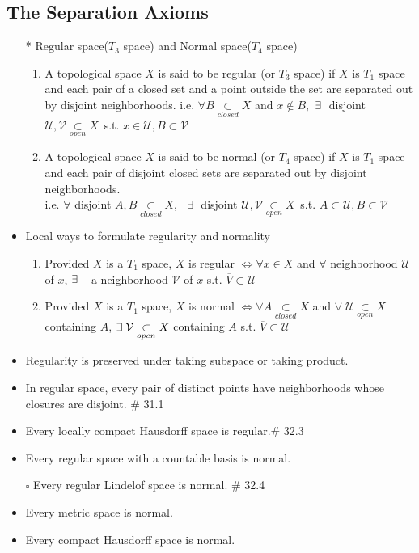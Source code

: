 \documentclass[12pt]{article}
\newcommand{\sq}{$\square$}
\newcommand{\spone}{\hspace{0.1cm}}
\newcommand{\U}{\mathcal{U}}
\newcommand{\V}{\mathcal{V}}
\newcommand{\open}{\underset{open}{\subset}}
\newcommand{\closed}{\underset{closed}{\subset}}
\newcommand{\cl}{\overline}
\newcommand{\exist}{\exists\spone}
\begin{document}
\subsection{The Separation Axioms}
\smallskip
\begin{itemize}
	\item[*] Regular space($T_3$ space) and Normal space($T_4$ space)
	\begin{enumerate}
		\item A topological space $X$ is said to be regular (or $T_3$ space) if $X$ is $T_1$ space and each pair of a closed set and a point outside the set are separated out by disjoint neighborhoods. i.e. $\forall B\closed X$ and $x\notin B$,\, $\exist$ disjoint\; $\U, \V\open X$\, s.t. $x\in \U, B\subset \V$
		\item A topological space $X$ is said to be normal (or $T_4$ space) if $X$ is $T_1$ space and each pair of disjoint closed sets are separated out by disjoint neighborhoods.\\ i.e. $\forall$ disjoint\; $A,B\closed X$, \, $\exist$ disjoint\; $\U, \V \open X$\, s.t. $A\subset \U, B\subset \V$
	\end{enumerate} 
	\item Local ways to formulate regularity and normality
	\begin{enumerate}
		\item Provided $X$ is a $T_1$ space, $X$ is regular $\Leftrightarrow \forall x\in X$ and $\forall$ neighborhood $\U$ of $x$, $\exist$ \, a neighborhood $\V$ of $x$ s.t. $\cl{V}\subset \U$
		\item Provided $X$ is a $T_1$ space, $X$ is normal $\Leftrightarrow \forall A\closed X$ and $\forall \; \U\open X$ containing $A$, $\exist \V \open X$ containing $A$ s.t. $\cl{V}\subset \U$  
	\end{enumerate}
	\item Regularity is preserved under taking subspace or taking product.
	\item In regular space, every pair of distinct points have neighborhoods whose closures are disjoint. \quad \# 31.1
	\item Every locally compact Hausdorff space is regular.\quad \# 32.3
	\item Every regular space with a countable basis is normal.
	\item[\sq] Every regular Lindelof space is normal. \quad \# 32.4
	\item Every metric space is normal.
	\item Every compact Hausdorff space is normal.

\end{itemize}
\end{document}

